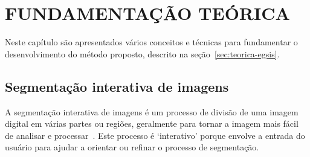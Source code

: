 \chapter{FUNDAMENTAÇÃO TEÓRICA}\label{cap:fundamentacao-teorica}


Neste capítulo são apresentados vários conceitos e técnicas para fundamentar
o desenvolvimento do método proposto, descrito na seção~\ref{sec:teorica-egsis}.


\section{Segmentação interativa de imagens}\label{sec:segmentacao-interativa}

A segmentação interativa de imagens é um processo de divisão de uma
imagem digital em várias partes ou regiões, geralmente para tornar a
imagem mais fácil de analisar e processar~\cite{ramadan2020survey}. Este processo é `interativo'
porque envolve a entrada do usuário para ajudar a orientar ou refinar
o processo de segmentação.

\begin{figure}[h!]
        \captionsetup{width=12cm}
		\centering
\end{figure}
\FloatBarrier{}


